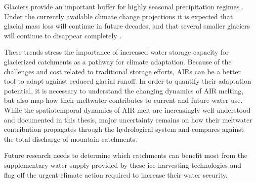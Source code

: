 Glaciers provide an important buffer for highly seasonal precipitation regimes
\citep{kaserContributionPotentialGlaciers2010}. Under the currently available climate change projections it is
expected that glacial mass loss will continue in future decades, and that several smaller glaciers will continue
to disappear completely \citep{rabatelCurrentStateGlaciers2013}.

These trends stress the importance of increased water storage capacity for glacierized catchments as a pathway
for climate adaptation. Because of the challenges and cost related to traditional storage efforts, AIRs can be a
better tool to adapt against reduced glacial runoff. In order to quantify their adaptation potential, it is
necessary to understand the changing dynamics of AIR melting, but also map how their meltwater contributes to
current and future water use. While the spatiotemporal dynamics of AIR melt are increasingly well understood and
documented in this thesis, major uncertainty remains on how their meltwater contribution propagates through the
hydrological system and compares against the total discharge of mountain catchments.

Future research needs to determine which catchments can benefit most from the supplementary water supply
provided by these ice harvesting technologies and flag off the urgent climate action required to increase their
water security.





%
%
%
